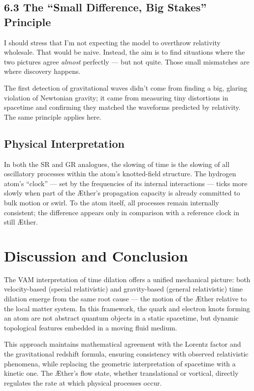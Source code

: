 \documentclass[11pt]{article}
\begin{document}
\subsection*{6.3 The “Small Difference, Big Stakes” Principle}

I should stress that I’m not expecting the model to overthrow relativity wholesale. That would be naive. Instead, the aim is to find situations where the two pictures agree \textit{almost} perfectly — but not quite. Those small mismatches are where discovery happens.

The first detection of gravitational waves didn’t come from finding a big, glaring violation of Newtonian gravity; it came from measuring tiny distortions in spacetime and confirming they matched the waveforms predicted by relativity. The same principle applies here.

\subsection{Physical Interpretation}

In both the SR and GR analogues, the slowing of time is the slowing of all oscillatory processes within the atom's knotted-field structure. The hydrogen atom's ``clock'' --- set by the frequencies of its internal interactions --- ticks more slowly when part of the Æther's propagation capacity is already committed to bulk motion or swirl. To the atom itself, all processes remain internally consistent; the difference appears only in comparison with a reference clock in still Æther.

\section{Discussion and Conclusion}

The VAM interpretation of time dilation offers a unified mechanical picture: both velocity-based (special relativistic) and gravity-based (general relativistic) time dilation emerge from the same root cause --- the motion of the Æther relative to the local matter system. In this framework, the quark and electron knots forming an atom are not abstract quantum objects in a static spacetime, but dynamic topological features embedded in a moving fluid medium.

This approach maintains mathematical agreement with the Lorentz factor and the gravitational redshift formula, ensuring consistency with observed relativistic phenomena, while replacing the geometric interpretation of spacetime with a kinetic one. The Æther's flow state, whether translational or vortical, directly regulates the rate at which physical processes occur.
\end{document}
